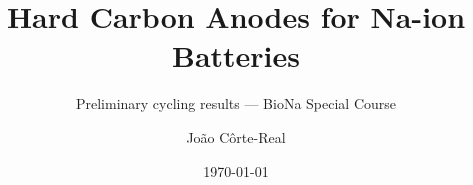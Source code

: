 \documentclass[aspectratio=169,hyperref={pdfpagelabels=false}]{beamer}
\title[Hard carbon anodes for Na-ion: first cycling]{Hard Carbon Anodes for Na-ion Batteries}
\subtitle[BioNa Special Course]{Preliminary cycling results --- BioNa Special Course}
\author{Jo\~ao C\^orte-Real}
\date{\today}
\begin{document}
\inserttitlepage   %


\end{document}
